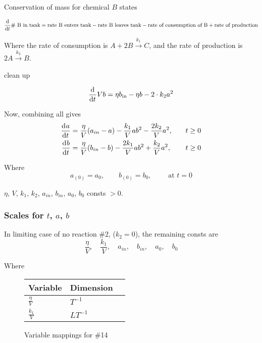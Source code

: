 \documentclass[12pt]{article}
\begin{document}
Conservation of mass for chemical $B$ states

\begin{equation}
  \frac{\mathrm{d}^{} {}}{\mathrm{d}{t}^{}}\text{\# B in tank} = \text{rate B enters tank} - \text{rate B leaves
    tank} - \text{rate of consumption of B} + \text{rate of production}
\end{equation}

Where the rate of consumption is $A + 2B \xrightarrow{k_1} C$, and the rate of
production is $2A \xrightarrow{k_2} B$.

\todo clean up

\begin{equation}
  \frac{\mathrm{d}^{} {}}{\mathrm{d}{t}^{}}Vb = \eta b_{\text{in}} - \eta b - 2\cdot k_2a^2
\end{equation}

Now, combining all gives
\begin{equation}
  \begin{aligned}
    \frac{\mathrm{d}^{} {a}}{\mathrm{d}{t}^{}} &= \frac{\eta}{V}(a_{in}-a) - \frac{k_1}{V}ab^2 - \frac{2k_2}{V}a^2, &\quad t&\ge0 \\
    \frac{\mathrm{d}^{} {b}}{\mathrm{d}{t}^{}} &= \frac{\eta}{V}(b_{in}-b) - \frac{2k_1}{V}ab^2 + \frac{k_2}{V}a^2, &\quad t&\ge0 \\
  \end{aligned}
\end{equation}

Where
\begin{equation}
  a_{(0)}=a_0,\qquad b_{(0)}=b_0,\qquad \text{ at } t=0
\end{equation}

$\eta$, $V$, $k_1$, $k_2$, $a_{in}$, $b_{in}$, $a_0$, $b_0$ consts $>0$.

\subsubsection{Scales for $t$, $a$, $b$}
In limiting case of no reaction \#2, ($k_2=0$), the remaining consts are
\begin{equation}
  \frac{\eta}{V},\quad \frac{k_1}{V}, \quad a_{in}, \quad b_{in}, \quad a_0, \quad b_0
\end{equation}

Where
  \begin{figure}
    \centering
    \begin{tabularx}{0.5\textwidth}{XXX}
      Variable & Dimension \\ \hline
      $\frac{\eta}{V}$ & $T^{-1}$  \\
      $\frac{k_1}{V}$ & $LT^{-1}$ \\
    \end{tabularx}
    \caption{Variable mappings for \#14}
    \label{fig:14-var-mappings}
  \end{figure}
\end{document}
